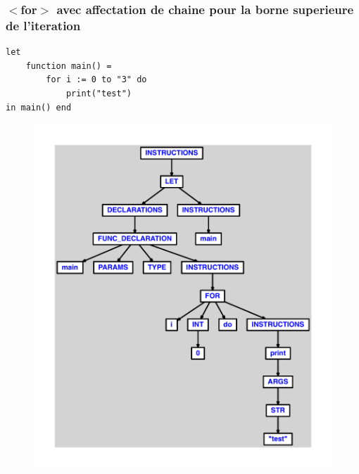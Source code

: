 \documentclass{article}
\begin{document}
\subsubsection{$ < $for$ > $ avec affectation de chaine pour la borne superieure de l'iteration}
\begin{lstlisting}
let
	function main() =
		for i := 0 to "3" do
			print("test")
in main() end
\end{lstlisting}
\newpage
\begin{figure}[H]
\centering
\includegraphics[max width=\textwidth]{ast/ast_193.pdf}
\end{figure}
\newpage
\end{document}
